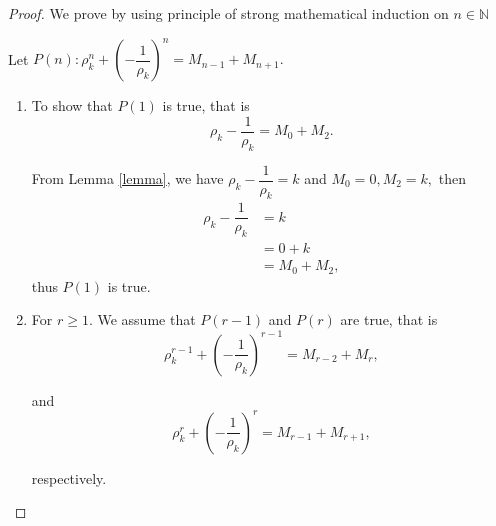 \documentclass{rmutt-seminar}
\begin{document}
\begin{proof}
We prove by using principle of strong mathematical induction on $n \in \mathbb{N}$

\quad Let $P(n): \rho_k ^n + \left(-\dfrac{1}{\rho_k }\right)^n = M_{n-1} + M_{n+1}.$ 
\begin{enumerate}[label=(\roman*),leftmargin = 1.5cm]
	\item To show  that $P(1)$ is true, that is 
	$$\rho_k - \dfrac{1}{\rho_k} = M_{0} + M_{2}.$$ 

 From Lemma \ref{lemma}, we have $\rho_k - \dfrac{1}{\rho_k} =k $ and $M_0=0, M_2=k,$ then 
  \begin{align*}
 	\rho_k - \dfrac{1}{\rho_k} &= k\\
 	&= 0 + k\\
 	&= M_{0} + M_{2},
 \end{align*}
 thus  $P(1)$  is true.
 
 \item For $r \geq 1$. We assume that $P(r-1)$ and $P(r)$ are true, that is
 \begin{equation*}
	\rho_k^{r-1} + \left(-\dfrac{1}{\rho_k}\right)^{r-1} = M_{r-2} + M_{r}, 
\end{equation*}

and
\begin{equation*}
	\rho_k^{r} + \left(-\dfrac{1}{\rho_k}\right)^{r} = M_{r-1} + M_{r+1},
\end{equation*}
	
respectively.


\end{enumerate}
\end{proof}
\end{document}
